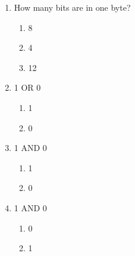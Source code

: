 \documentclass[twocolumn]{article}
\begin{document}
\begin{enumerate}



  \item How many bits are in one byte?

  \begin{enumerate}
   
   \item 8
   
   \item 4
   
   \item 12
   
  \end{enumerate}



  \item 1 OR 0

  \begin{enumerate}
   
   \item 1
   
   \item 0
   
  \end{enumerate}



  \item 1 AND 0

  \begin{enumerate}
   
   \item 1
   
   \item 0
   
  \end{enumerate}



  \item 1 AND 0

  \begin{enumerate}
   
   \item 0
   
   \item 1
   
  \end{enumerate}


\end{enumerate}


\end{document}
